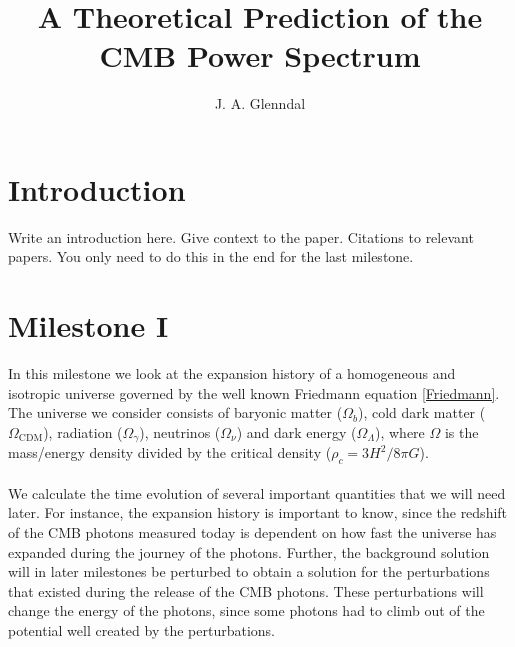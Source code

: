 \documentclass{aa}
\begin{document}
 

   \title{A Theoretical Prediction of the CMB Power Spectrum}

   \author{J. A. Glenndal}


   \date{}



   \maketitle

\section{Introduction}
Write an introduction here. Give context to the paper. Citations to relevant papers. You only need to do this in the end for the last milestone.


\section{Milestone I}
In this milestone we look at the expansion history of a homogeneous and isotropic universe governed by the well known Friedmann equation \ref{Friedmann}.
The universe we consider consists of baryonic matter ($\Omega_b$), cold dark matter ($\Omega_\mathrm{CDM}$), radiation ($\Omega_\gamma$), neutrinos ($\Omega_\nu$)
and dark energy ($\Omega_\Lambda$), where $\Omega$ is the mass/energy density divided by the critical density ($\rho_c = 3H^2/8\pi G$).\\
\\
We calculate the time evolution of several important quantities that we will need later. For instance, the expansion history is important to know, since
the redshift of the CMB photons measured today is dependent on how fast the universe has expanded during the journey of the photons. Further, the background solution
will in later milestones be perturbed to obtain a solution for the perturbations that existed during the release of the CMB photons. These perturbations will change the energy of the photons,
since some photons had to climb out of the potential well created by the perturbations.
\end{document}
